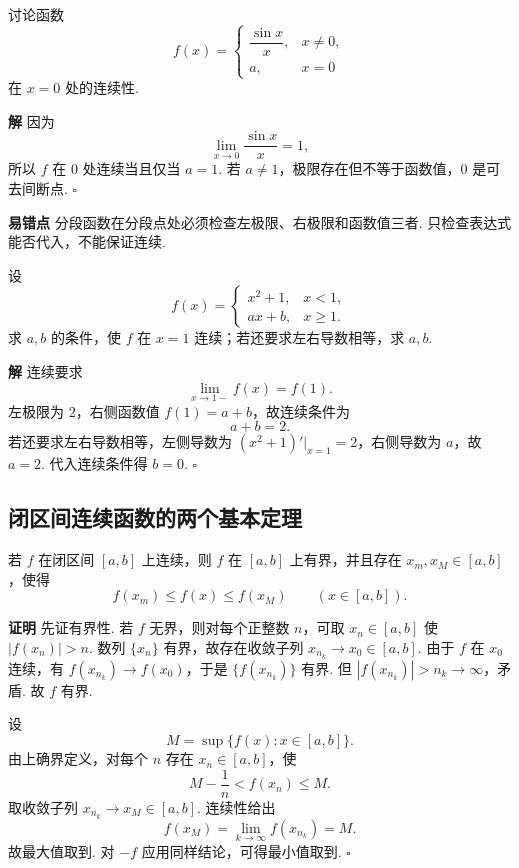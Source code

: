 \documentclass[fontset=fandol]{ctexart}
\newenvironment{proofdetail}{\par\noindent\textbf{证明}\quad}{\hfill$\square$\par\vspace{0.8em}}
\newenvironment{solution}{\par\noindent\textbf{解}\quad}{\hfill$\square$\par\vspace{0.8em}}
\newenvironment{warning}{\par\noindent\textbf{易错点}\quad}{\par\vspace{0.8em}}
\begin{document}
\begin{example}
讨论函数
\[
f(x)=
\begin{cases}
\dfrac{\sin x}{x},&x\neq0,\\
a,&x=0
\end{cases}
\]
在 $x=0$ 处的连续性.
\end{example}
\begin{solution}
因为
\[
\lim_{x\to0}\frac{\sin x}{x}=1,
\]
所以 $f$ 在 $0$ 处连续当且仅当 $a=1$. 若 $a\neq1$，极限存在但不等于函数值，$0$ 是可去间断点.
\end{solution}
\begin{warning}
分段函数在分段点处必须检查左极限、右极限和函数值三者. 只检查表达式能否代入，不能保证连续.
\end{warning}

\begin{example}
设
\[
f(x)=
\begin{cases}
x^2+1,&x<1,\\
ax+b,&x\ge1.
\end{cases}
\]
求 $a,b$ 的条件，使 $f$ 在 $x=1$ 连续；若还要求左右导数相等，求 $a,b$.
\end{example}
\begin{solution}
连续要求
\[
\lim_{x\to1-}f(x)=f(1).
\]
左极限为 $2$，右侧函数值 $f(1)=a+b$，故连续条件为
\[
a+b=2.
\]
若还要求左右导数相等，左侧导数为 $(x^2+1)'|_{x=1}=2$，右侧导数为 $a$，故 $a=2$. 代入连续条件得 $b=0$.
\end{solution}

\subsection{闭区间连续函数的两个基本定理}

\begin{theorem}[有界性与最值定理]
若 $f$ 在闭区间 $[a,b]$ 上连续，则 $f$ 在 $[a,b]$ 上有界，并且存在 $x_m,x_M\in[a,b]$，使得
\[
f(x_m)\le f(x)\le f(x_M)\qquad (x\in[a,b]).
\]
\end{theorem}
\begin{proofdetail}
先证有界性. 若 $f$ 无界，则对每个正整数 $n$，可取 $x_n\in[a,b]$ 使 $|f(x_n)|>n$. 数列 $\{x_n\}$ 有界，故存在收敛子列 $x_{n_k}\to x_0\in[a,b]$. 由于 $f$ 在 $x_0$ 连续，有 $f(x_{n_k})\to f(x_0)$，于是 $\{f(x_{n_k})\}$ 有界. 但 $|f(x_{n_k})|>n_k\to\infty$，矛盾. 故 $f$ 有界.

设
\[
M=\sup\{f(x):x\in[a,b]\}.
\]
由上确界定义，对每个 $n$ 存在 $x_n\in[a,b]$，使
\[
M-\frac1n<f(x_n)\le M.
\]
取收敛子列 $x_{n_k}\to x_M\in[a,b]$. 连续性给出
\[
f(x_M)=\lim_{k\to\infty}f(x_{n_k})=M.
\]
故最大值取到. 对 $-f$ 应用同样结论，可得最小值取到.
\end{proofdetail}
\end{document}
